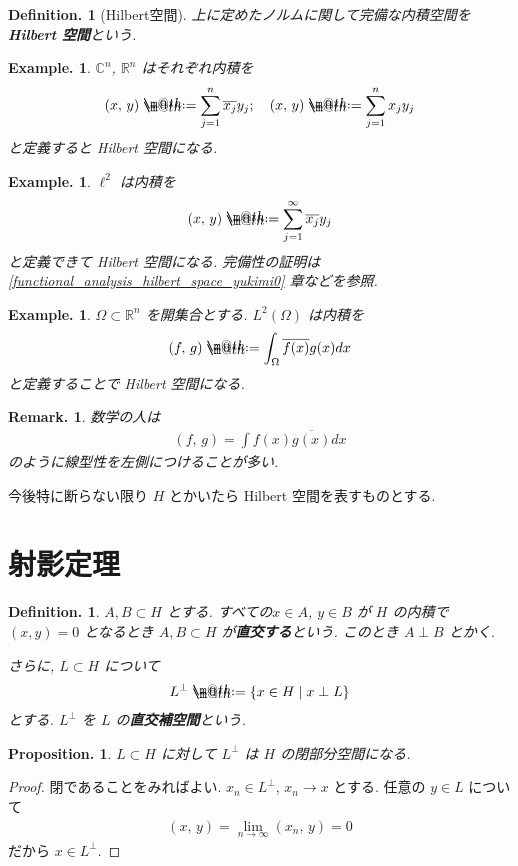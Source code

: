\documentclass[openany, a4paper, oneside]{jsbook}
\makeatletter
\newcommand*{\defeq}{\mathrel{\rlap{%
\raisebox{0.3ex}{$\m@th\cdot$}}%
\raisebox{-0.3ex}{$\m@th\cdot$}}%
=}
\theoremstyle{break}
\newtheorem{prop}[thm]{Proposition.}
\theoremstyle{breakdefn}
\newtheorem{defn}[thm]{Definition.}
\newtheorem{ex}[thm]{Example.}
\newtheorem{rem}[thm]{Remark.}
\newcommand{\rbkt}[2]{\left ( #1,\,#2 \right)}
\newcommand{\relmiddle}[1]{\mathrel{}\middle#1\mathrel{}}
\newcommand{\set}[2]{\left\{#1 \relmiddle| #2\right\}}
\newcommand{\bbC}{\mathbb{C}}
\newcommand{\bbR}{\mathbb{R}}
\newcommand{\bbRn}{\mathbb{R}^n}
\makeatother
\begin{document}
\begin{defn}[Hilbert空間]
上に定めたノルムに関して完備な内積空間を\textbf{Hilbert 空間}という.
\end{defn}
\begin{ex}
$\bbC^n$, $\bbR^n$ はそれぞれ内積を
\begin{align}
 \rbkt{x}{y}
 \defeq
 \sum_{j=1}^n \overline{x_j} y_j ; \quad
 \rbkt{x}{y}
 \defeq
 \sum_{j=1}^n x_j y_j
\end{align}
と定義すると Hilbert 空間になる.
\end{ex}
\begin{ex}
$\ell^2$ は内積を
\begin{align}
 \rbkt{x}{y}
 \defeq
 \sum_{j=1}^{\infty} \overline{x_j} y_j
\end{align}
と定義できて Hilbert 空間になる.
完備性の証明は \ref{functional_analysis_hilbert_space_yukimi0} 章などを参照.
\end{ex}
\begin{ex}
$\Omega \subset \bbRn$ を開集合とする.
$L^2(\Omega)$ は内積を
\begin{align}
 \rbkt{f}{g}
 \defeq
 \int_{\Omega} \overline{f(x)} g(x) dx
\end{align}
と定義することで Hilbert 空間になる.
\end{ex}
\begin{rem}
数学の人は
\begin{align}
 \rbkt{f}{g}
 =
 \int f(x) \overline{g(x)} dx
\end{align}
のように線型性を左側につけることが多い.
\end{rem}

今後特に断らない限り $H$ とかいたら Hilbert 空間を表すものとする.
\section{射影定理}


\begin{defn}
 $A, B \subset H$ とする.
 すべての$x \in A$, $y \in B$ が $H$ の内積で $(x, y) = 0$ となるとき
 $A, B \subset H$ が\textbf{直交する}という.
 このとき $A \perp B$ とかく.

 さらに,
 $L \subset H$ について
 \begin{align}
  L^{\perp}
  \defeq
  \set{x \in H}{x \perp L}
 \end{align}
 とする.
 $L^{\perp}$ を $L$ の\textbf{直交補空間}という.
\end{defn}

\begin{prop}
 $L \subset H$ に対して $L^{\perp}$ は $H$ の閉部分空間になる.
\end{prop}
\begin{proof}
閉であることをみればよい.
$x_n \in L^{\perp}$, $x_n \to x$ とする.
任意の $y \in L$ について
\begin{align}
 \rbkt{x}{y}
 =
 \lim_{n \to \infty} \rbkt{x_n}{y}
 =
 0
\end{align}
だから $x \in L^{\perp}$.
\end{proof}
\end{document}
